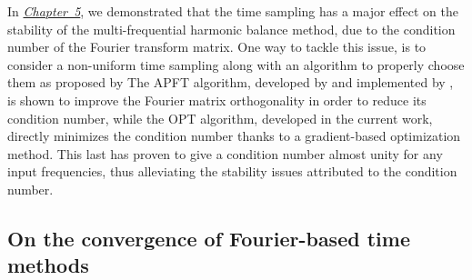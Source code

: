 In \hyperref[cha:limitations_condition_number]{\emph{Chapter~5}},
we demonstrated that the time sampling has a major effect on the
stability of the multi-frequential harmonic balance 
method, due to the condition number of the Fourier
transform matrix. One way to tackle this issue, 
is to consider a non-uniform time sampling
along with an algorithm to properly choose them
as proposed by \citet{ThesisGuedeney}
The APFT algorithm, developed
by \citet{Kundert1988} and implemented by 
\citet{ThesisGuedeney}, is shown to improve the
Fourier matrix orthogonality in order to 
reduce its condition number, while
the OPT algorithm, developed in the current work, 
directly minimizes the condition number thanks to a
gradient-based optimization method. This last has proven to
give a condition number almost unity for any input frequencies,
thus alleviating the stability issues attributed to 
the condition number.

\subsection*{On the convergence of Fourier-based time methods}

